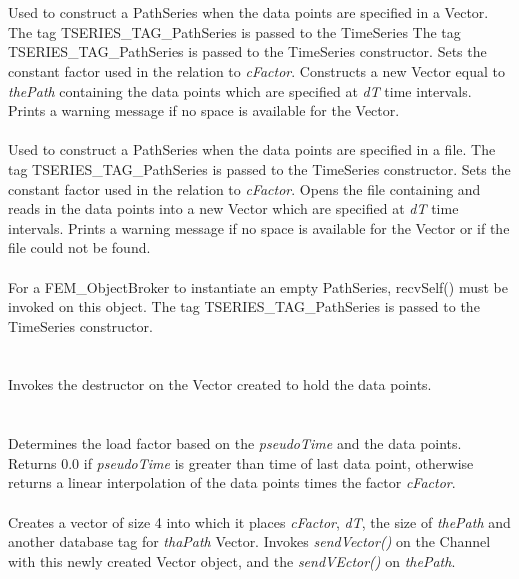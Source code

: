  \\ 
\\ 
Used to construct a PathSeries when the data points are specified in a
Vector. The tag TSERIES\_TAG\_PathSeries is passed to the TimeSeries
The tag TSERIES\_TAG\_PathSeries is passed to the TimeSeries
constructor. Sets the constant factor used in the relation to {\em
cFactor}. Constructs a new Vector equal to {\em thePath} containing the
data points which are specified at {\em dT} time intervals. Prints a
warning message if no space is available for the Vector.\\

\\ 
Used to construct a PathSeries when the data points are specified in a
file. The tag TSERIES\_TAG\_PathSeries is passed to the TimeSeries
constructor. Sets the constant factor used in the relation to {\em
cFactor}. Opens the file containing and reads in the data points into
a new Vector which are specified at {\em dT} time intervals. Prints a
warning message if no space is available for the Vector or if the file
could not be found.\\


\\ 
For a FEM\_ObjectBroker to instantiate an empty PathSeries, recvSelf()
must be invoked on this object. The tag TSERIES\_TAG\_PathSeries is
passed to the TimeSeries constructor. \\


 \\
\\ 
Invokes the destructor on the Vector created to hold the data
points. \\


 \\
\\
Determines the load factor based on the {\em pseudoTime} and the data
points. Returns $0.0$ if {\em pseudoTime} is greater than time of last
data point, otherwise returns a linear interpolation of the data
points times the factor {\em cFactor}. \\

\\
Creates a vector of size 4 into which it places {\em cFactor}, {\em
dT}, the size of {\em thePath} and another database tag for {\em
thaPath} Vector.  Invokes {\em sendVector()} on the Channel with this
newly created Vector object, and the {\em sendVEctor()} on {\em
thePath}. \\


